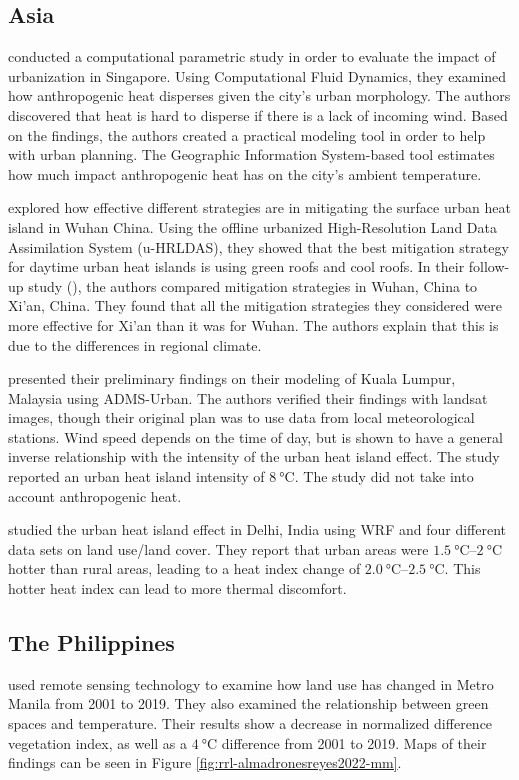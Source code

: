				
	\subsection{Asia}
		\textcite{Yuan2020} conducted a computational parametric study in order to evaluate the impact of urbanization in Singapore.
		Using Computational Fluid Dynamics, they examined how anthropogenic heat disperses given the city's urban morphology.
		The authors discovered that heat is hard to disperse if there is a lack of incoming wind.
		Based on the findings, the authors created a practical modeling tool in order to help with urban planning. 
		The Geographic Information System-based tool estimates how much impact anthropogenic heat has on the city's ambient temperature.
		
		\textcite{Gao2019} explored how effective different strategies are in mitigating the surface urban heat island in Wuhan China.
		Using the offline urbanized High-Resolution Land Data Assimilation System (u-HRLDAS), they showed that the best mitigation strategy for daytime urban heat islands is using green roofs and cool roofs.
		In their follow-up study (\cite{Gao2020}), the authors compared mitigation strategies in Wuhan, China to Xi'an, China.
		They found that all the mitigation strategies they considered were more effective for Xi'an than it was for Wuhan. 
		The authors explain that this is due to the differences in regional climate.
		
		\textcite{Wang2019} presented their preliminary findings on their modeling of Kuala Lumpur, Malaysia using ADMS-Urban.
		The authors verified their findings with landsat images, though their original plan was to use data from local meteorological stations.
		Wind speed depends on the time of day, but is shown to have a general inverse relationship with the intensity of the urban heat island effect.
		The study reported an urban heat island intensity of $\qty{8}{\degreeCelsius}$.
		The study did not take into account anthropogenic heat.
		
		\textcite{Bhati2018} studied the urban heat island effect in Delhi, India using WRF and four different data sets on land use/land cover.
		They report that urban areas were $\qtyrange{1.5}{2}{\degreeCelsius}$ hotter than rural areas, leading to a heat index change of $\qtyrange{2.0}{2.5}{\degreeCelsius}$.
		This hotter heat index can lead to more thermal discomfort.

	\subsection{The Philippines}
		\textcite{AlmadronesReyes2022} used remote sensing technology to examine how land use has changed in Metro Manila from 2001 to 2019. 
		They also examined the relationship between green spaces and temperature. 
		Their results show a decrease in normalized difference vegetation index, 
			as well as a $\qty{4}{\degreeCelsius}$ difference from 2001 to 2019.
		Maps of their findings can be seen in Figure \ref{fig:rrl-almadronesreyes2022-mm}.
		
